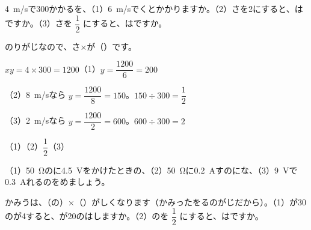 \begin{reidai}
\qty{4}{m/s}で300かかるを、（1）\qty{6}{m/s}でくとかかりますか。（2）さを2にすると、はですか。（3）さを $\dfrac{1}{2}$ にすると、はですか。\par
\kangaekata {}のりがじなので、さ×が（）です。\par
\shiki $xy=4\times300=1200$\quad（1）\nobreak$y=\dfrac{1200}{6}=200$\par
\hspace*{2.6\zw}（2）\nobreak\qty{8}{m/s}なら $y=\dfrac{1200}{8}=150$。$150\div300=\dfrac{1}{2}$\par
\hspace*{2.6\zw}（3）\nobreak\qty{2}{m/s}なら $y=\dfrac{1200}{2}=600$。$600\div300=2$\par
\kotae（1）\quad（2）\nobreak$\dfrac{1}{2}$\quad（3）
\end{reidai}

\begingroup{}%
\noindent\begin{minipage}[t]{0.49\linewidth}
\begin{jibun}
（1）\qty{50}{\ohm}のに\qty{4.5}{V}をかけたときの、（2）\qty{50}{\ohm}に\qty{0.2}{A}すのにな、（3）\qty{9}{V}で\qty{0.3}{A}れるのをめましょう。
\end{jibun}
\end{minipage}\hfill
\begin{minipage}[t]{0.49\linewidth}
\begin{jibun}
かみうは、（の）×（）がしくなります（かみったをるのがじだから）。（1）が30のが4すると、が20のはしますか。（2）のを $\dfrac{1}{2}$ にすると、はですか。
\end{jibun}
\end{minipage}\par
\endgroup


